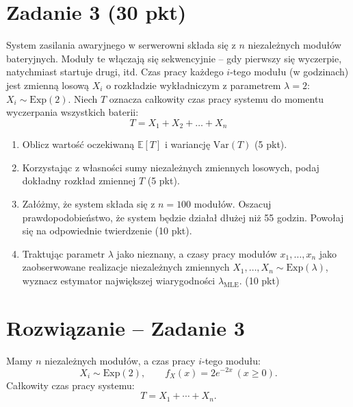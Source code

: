 \documentclass[polish, 10pt]{extarticle}
\begin{document}
\section*{Zadanie 3 (30 pkt)}
System zasilania awaryjnego w serwerowni składa się z $n$ niezależnych modułów bateryjnych. Moduły te włączają się sekwencyjnie – gdy pierwszy się wyczerpie, natychmiast startuje drugi, itd. Czas pracy każdego $i$-tego modułu (w godzinach) jest zmienną losową $X_i$ o rozkładzie wykładniczym z parametrem $\lambda = 2$: $X_i \sim \text{Exp}(2)$. Niech $T$ oznacza całkowity czas pracy systemu do momentu wyczerpania wszystkich baterii:
\[
T = X_1 + X_2 + \dots + X_n
\]

\begin{enumerate}
    \item[a)] Oblicz wartość oczekiwaną $\mathbb{E}[T]$ i wariancję $\text{Var}(T)$ \hfill (5 pkt).
    \item[b)] Korzystając z własności sumy niezależnych zmiennych losowych, podaj dokładny rozkład zmiennej $T$ \hfill (5 pkt).
    \item[c)] Załóżmy, że system składa się z $n=100$ modułów. Oszacuj prawdopodobieństwo, że system będzie działał dłużej niż 55 godzin. Powołaj się na odpowiednie twierdzenie \hfill (10 pkt).
    \item[d)] Traktując parametr $\lambda$ jako nieznany, a czasy pracy modułów $x_1,\dots,x_n$ jako zaobserwowane realizacje niezależnych zmiennych $X_1,\dots,X_n \sim \mathrm{Exp}(\lambda)$, wyznacz estymator największej wiarygodności $\hat\lambda_{\text{MLE}}$. \hfill (10 pkt)
\end{enumerate}

\section*{Rozwiązanie -- Zadanie 3}

Mamy $n$ niezależnych modułów, a czas pracy $i$-tego modułu:
\[
X_i\sim \mathrm{Exp}(2),\qquad f_{X}(x)=2e^{-2x}\ (x\ge 0).
\]
Całkowity czas pracy systemu:
\[
T=X_1+\cdots+X_n.
\]
\end{document}
